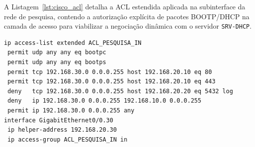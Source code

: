 A Listagem~\ref{lst:cisco_acl} detalha a ACL estendida aplicada na subinterface da rede de pesquisa, contendo a autorização explícita de pacotes BOOTP/DHCP na camada de acesso para viabilizar a negociação dinâmica com o servidor \texttt{SRV-DHCP}.

\begin{lstlisting}[language=bash,caption={Regras de ACL estendida aplicadas no gateway da rede de pesquisa.},label={lst:cisco_acl}]
ip access-list extended ACL_PESQUISA_IN
 permit udp any any eq bootpc
 permit udp any any eq bootps
 permit tcp 192.168.30.0 0.0.0.255 host 192.168.20.10 eq 80
 permit tcp 192.168.30.0 0.0.0.255 host 192.168.20.10 eq 443
 deny   tcp 192.168.30.0 0.0.0.255 host 192.168.20.20 eq 5432 log
 deny   ip 192.168.30.0 0.0.0.255 192.168.10.0 0.0.0.255
 permit ip 192.168.30.0 0.0.0.255 any
interface GigabitEthernet0/0.30
 ip helper-address 192.168.20.30
 ip access-group ACL_PESQUISA_IN in
\end{lstlisting}
